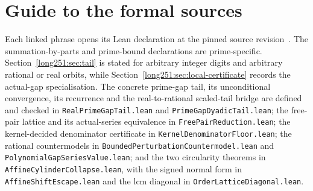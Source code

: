 \section{Guide to the formal sources}\label{long251:app:index}

Each linked phrase opens its Lean declaration at the pinned source
revision~\commitshort.  The summation-by-parts and prime-bound declarations
are prime-specific.  Section~\ref{long251:sec:tail} is stated for arbitrary integer
digits and arbitrary rational or real orbits, while
Section~\ref{long251:sec:local-certificate} records the actual-gap specialisation.  The
concrete prime-gap tail, its unconditional convergence, its recurrence and the
real-to-rational scaled-tail bridge are defined and checked in
\texttt{RealPrimeGapTail.lean} and \texttt{PrimeGapDyadicTail.lean}; the
free-pair lattice and its actual-series equivalence in
\texttt{FreePairReduction.lean}; the kernel-decided denominator certificate in
\texttt{KernelDenominatorFloor.lean}; the rational countermodels in
\texttt{BoundedPerturbationCountermodel.lean} and
\texttt{PolynomialGapSeriesValue.lean}; and the two circularity theorems in
\texttt{AffineCylinderCollapse.lean}, with the signed normal form in
\texttt{AffineShiftEscape.lean} and the lcm diagonal in
\texttt{OrderLatticeDiagonal.lean}.

\iffalse

